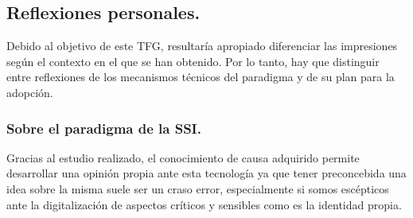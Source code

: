\documentclass[../main.tex]{subfiles}
\begin{document}
\subsection{Reflexiones personales.}\label{Reflexiones personales}
Debido al objetivo de este \acrshort{TFG}, resultaría apropiado diferenciar las impresiones según el contexto en el que se han obtenido. Por lo tanto, hay que distinguir entre reflexiones de los mecanismos técnicos del paradigma y de su plan para la adopción.
\\


\subsubsection{Sobre el paradigma de la \acrlong{SSI}.}
Gracias al estudio realizado, el conocimiento de causa adquirido permite desarrollar una opinión propia ante esta tecnología ya que tener preconcebida una idea sobre la misma suele ser un craso error, especialmente si somos escépticos ante la digitalización de aspectos críticos y sensibles como es la identidad propia.  
\\
\end{document}

